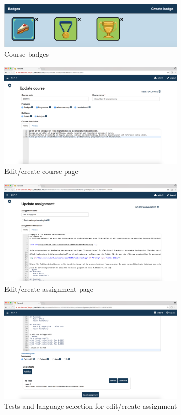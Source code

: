 \begin{figure}[H]
\centering
\includegraphics[width=0.8\textwidth]{img/gppinpictures/badges.png}
\caption{Course badges}
\label{fig:badges}
\end{figure}

\begin{figure}[H]
\centering
\includegraphics[width=0.8\textwidth]{img/gppinpictures/editcourse.png}
\caption{Edit/create course page}
\label{fig:editcourse}
\end{figure}

\begin{figure}[H]
\centering
\includegraphics[width=0.8\textwidth]{img/gppinpictures/editassignment.png}
\caption{Edit/create assignment page}
\label{fig:editassignment}
\end{figure}

\begin{figure}[H]
\centering
\includegraphics[width=0.8\textwidth]{img/gppinpictures/editassignmenttests.png}
\caption{Tests and language selection for edit/create assignment}
\label{fig:editassignment2}
\end{figure}

